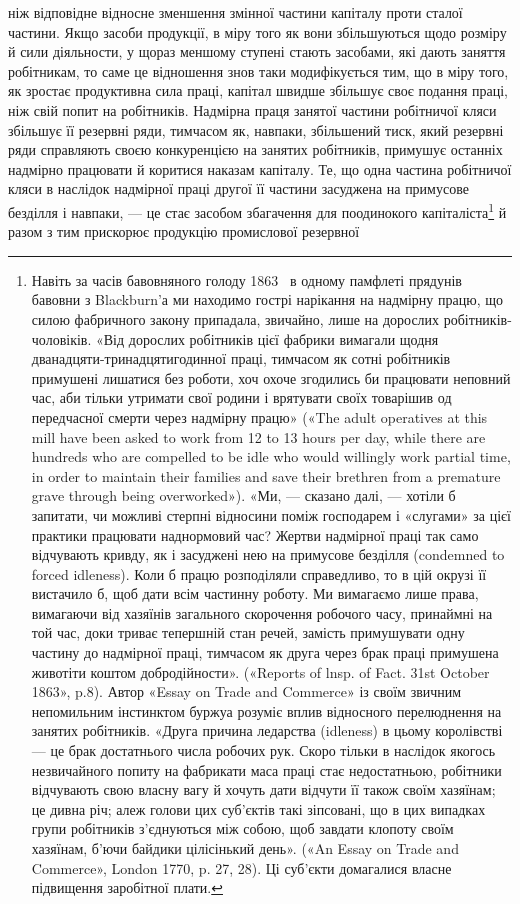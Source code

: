\parcont{}  %
ніж відповідне відносне зменшення змінної частини капіталу
проти сталої частини. Якщо засоби продукції, в міру того як
вони збільшуються щодо розміру й сили діяльности, у щораз
меншому ступені стають засобами, які дають заняття робітникам,
то саме це відношення знов таки модифікується тим, що в міру
того, як зростає продуктивна сила праці, капітал швидше збільшує
своє подання праці, ніж свій попит на робітників. Надмірна
праця занятої частини робітничої кляси збільшує її резервні
ряди, тимчасом як, навпаки, збільшений тиск, який резервні
ряди справляють своєю конкуренцією на занятих робітників,
примушує останніх надмірно працювати й коритися наказам
капіталу. Те, що одна частина робітничої кляси в наслідок надмірної
праці другої її частини засуджена на примусове безділля
і навпаки, — це стає засобом збагачення для поодинокого капіталіста\footnote{
Навіть за часів бавовняного голоду 1863~ в одному памфлеті
прядунів бавовни з Blackburn’а ми находимо гострі нарікання на надмірну
працю, що силою фабричного закону припадала, звичайно, лише
на дорослих робітників-чоловіків. «Від дорослих робітників цієї фабрики
вимагали щодня дванадцяти-тринадцятигодинної праці, тимчасом
як сотні робітників примушені лишатися без роботи, хоч охоче згодились
би працювати неповний час, аби тільки утримати свої родини і врятувати
своїх товарішив од передчасної смерти через надмірну працю» («The
adult operatives at this mill have been asked to work from 12 to 13 hours
per day, while there are hundreds who are compelled to be idle who would
willingly work partial time, in order to maintain their families and save
their brethren from a premature grave through being overworked»). «Ми, —
сказано далі, — хотіли б запитати, чи можливі стерпні відносини поміж
господарем і «слугами» за цієї практики працювати наднормовий час?
Жертви надмірної праці так само відчувають кривду, як і засуджені
нею на примусове безділля (condemned to forced idleness). Коли б працю
розподіляли справедливо, то в цій окрузі її вистачило б, щоб дати всім
частинну роботу. Ми вимагаємо лише права, вимагаючи від хазяїнів загального
скорочення робочого часу, принаймні на той час, доки триває
тепершній стан речей, замість примушувати одну частину до надмірної
праці, тимчасом як друга через брак праці примушена животіти коштом
добродійности». («Reports of lnsp. of Fact. 31st October 1863», p.8).
Автор «Essay on Trade and Commerce» із своїм звичним непомильним
інстинктом буржуа розуміє вплив відносного перелюднення на занятих
робітників. «Друга причина ледарства (idleness) в цьому королівстві —
це брак достатнього числа робочих рук. Скоро тільки в наслідок якогось
незвичайного попиту на фабрикати маса праці стає недостатньою, робітники
відчувають свою власну вагу й хочуть дати відчути її також своїм
хазяїнам; це дивна річ; алеж голови цих суб’єктів такі зіпсовані, що в цих
випадках групи робітників з’єднуються між собою, щоб завдати клопоту
своїм хазяїнам, б’ючи байдики цілісінький день». («An Essay on Trade
and Commerce», London 1770, p. 27, 28). Ці суб’єкти домагалися власне
підвищення заробітної плати.
} й разом з тим прискорює продукцію промислової резервної
